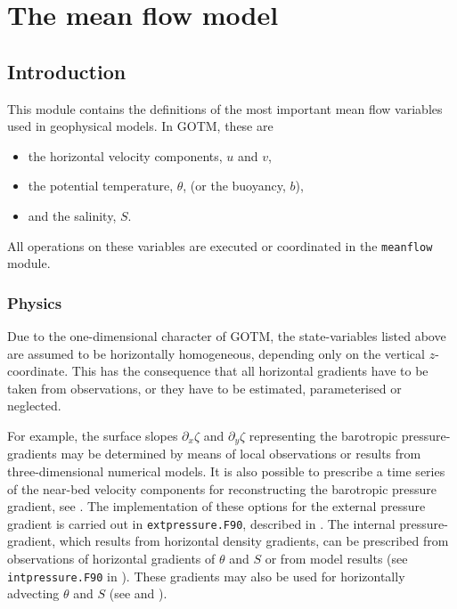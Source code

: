 %
%

\section{The mean flow model \label{sec:meanflowIntro}}

\subsection{Introduction}

This module contains the definitions of the most important
mean flow variables used in geophysical models. In GOTM, these
are
\begin{itemize}
  \item the horizontal velocity components, $u$ and $v$,
  \item the potential temperature, $\theta$, (or the buoyancy, $b$),
  \item and the salinity, $S$.
\end{itemize}
All operations on these variables are executed or coordinated in the 
{\tt meanflow} module.

\subsubsection{Physics}
Due to the one-dimensional character of GOTM, the state-variables
listed above are assumed to be horizontally homogeneous, depending
only on the vertical $z$-coordinate. This has the consequence that
all horizontal gradients have to be taken from observations, or they
have to be estimated, parameterised or neglected.

For example, the surface slopes $\partial_x\zeta$ and
$\partial_y\zeta$ representing the barotropic pressure-gradients may
be determined by means of local observations or results from
three-dimensional numerical models. It is also possible to prescribe
a time series of the near-bed velocity components for reconstructing
the barotropic pressure gradient, see
\cite{Burchard99}.  The implementation of these options for the
external pressure gradient is carried out in {\tt extpressure.F90},
described in .  The internal pressure-gradient,
which results from horizontal density gradients, can be prescribed
from observations of horizontal gradients of $\theta$ and $S$ or from
model results (see {\tt intpressure.F90} in ).
These gradients may also be used for horizontally advecting $\theta$
and $S$ (see  and ).

